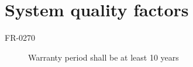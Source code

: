  \section{System quality factors}
 \begin{description}
 \item[FR-0270]Warranty period shall be at least 10 years
 \end{description}